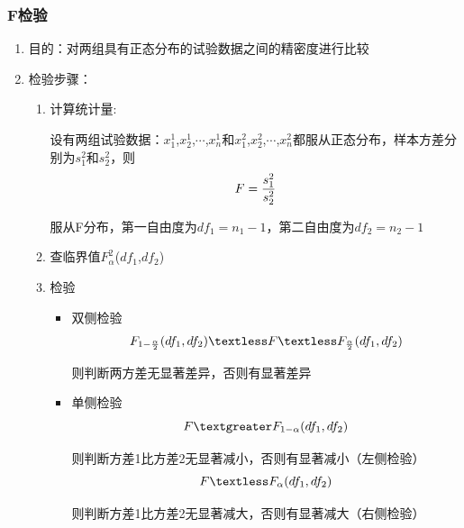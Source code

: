 \documentclass[UTF8]{ctexart}
\begin{document}
\subsubsection{F检验}
\begin{enumerate}[•]
  \item 目的：对两组具有正态分布的试验数据之间的精密度进行比较
  \item 检验步骤：
  \begin{enumerate}[1.]
    \item 计算统计量:
  \par 设有两组试验数据：$x_{1}^{1}$,$x_{2}^{1}$,$\cdots $,$x_{n}^{1}$和$x_{1}^{2}$,$x_{2}^{2}$,$\cdots $,$x_{n}^{2}$都服从正态分布，样本方差分别为$s_{1}^{2}$和$s_{2}^{2}$，则
\begin{equation}\notag
F=\frac{s_{1}^{2}}{s_{2}^{2}}
\end{equation}
\par 服从F分布，第一自由度为$df_{1}=n_{1}-1$，第二自由度为$df_{2}=n_{2}-1$
    \item 查临界值$F^{2}_{\alpha}$($df_{1}$,$df_{2}$)
    \item 检验
    \begin{itemize}
    \item 双侧检验
      \begin{equation}\notag
      F_{1-\frac{\alpha}{2}}(df_{1},df_{2})\textless F \textless F_{\frac{\alpha}{2}}(df_{1},df_{2})
      \end{equation}
      \par \quad 则判断两方差无显著差异，否则有显著差异
    \item 单侧检验
      \begin{equation}\notag
      F\textgreater F_{1-\alpha}(df_{1},df_{2})
      \end{equation}
      \par \quad 则判断方差1比方差2无显著减小，否则有显著减小（左侧检验）
      \begin{equation}\notag
      F\textless F_{\alpha}(df_{1},df_{2})
      \end{equation}
      \par \quad 则判断方差1比方差2无显著减大，否则有显著减大（右侧检验）
    \end{itemize} 
  \end{enumerate}
\end{enumerate}
\end{document}
